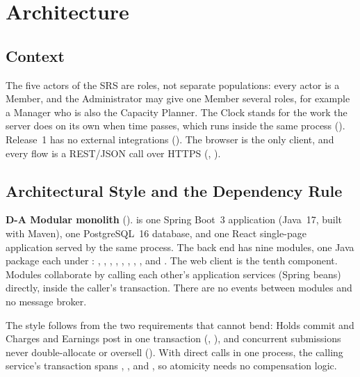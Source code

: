 \section{Architecture}\label{sec:arch}

\subsection{Context}

The five actors of the SRS are roles, not separate populations: every actor is a Member, and the Administrator may give one Member several roles, for example a Manager who is also the Capacity Planner. The Clock stands for the work the server does on its own when time passes, which runs inside the same process (). Release~1 has no external integrations (). The browser is the only client, and every flow is a REST/JSON call over HTTPS (, ).

\subsection{Architectural Style and the Dependency Rule}

\textbf{D-A Modular monolith} (). \SRSproduct{} is one Spring Boot~3 application (Java~17, built with Maven), one PostgreSQL~16 database, and one React single-page application served by the same process. The back end has nine modules, one Java package each under : , , , , , , , , and . The web client is the tenth component. Modules collaborate by calling each other's application services (Spring beans) directly, inside the caller's transaction. There are no events between modules and no message broker.

The style follows from the two requirements that cannot bend: Holds commit and Charges and Earnings post in one transaction (, ), and concurrent submissions never double-allocate or oversell (). With direct calls in one process, the calling service's transaction spans , , and , so atomicity needs no compensation logic.

